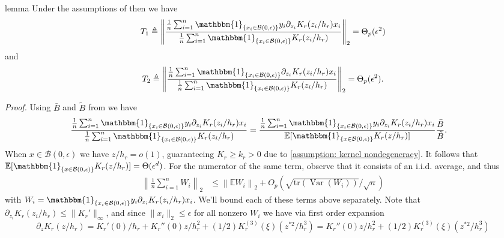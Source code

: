 \documentclass[11pt]{article}
\begin{document}
\begin{restatable}{lemma}{} \label{lemma: psi asymptotics}
    Under the assumptions of  then we have \begin{align*}
    T_1 \triangleq \left\|\frac{\frac{1}{n}\sum_{i = 1}^n\mathbbm{1}_{\{x_i \in \mathcal{B}(0, \epsilon)\}}y_i\partial_{z_i}K_r(z_i/h_r)x_i}{\frac{1}{n}\sum_{i = 1}^n\mathbbm{1}_{\{x_i \in \mathcal{B}(0, \epsilon)\}}K_r(z_i/h_r)}\right\|_2 = \Theta_p(\epsilon^2)
    \end{align*}
    and 
    \begin{align*}
    T_2 \triangleq\left\|\frac{\frac{1}{n}\sum_{i = 1}^n\mathbbm{1}_{\{x_i \in \mathcal{B}(0, \epsilon)\}}\partial_{z_i}K_r(z_i/h_r)x_i}{\frac{1}{n}\sum_{i = 1}^n\mathbbm{1}_{\{x_i \in \mathcal{B}(0, \epsilon)\}}K_r(z_i/h_r)}\right\|_2 = \Theta_p(\epsilon^2).
    \end{align*}
\end{restatable}
\noindent \textit{Proof.} Using $\bar{B}$ and $\tilde{B}$ from  we have
\begin{align}
    \frac{\frac{1}{n}\sum_{i = 1}^n\mathbbm{1}_{\{x_i \in \mathcal{B}(0, \epsilon)\}}y_i\partial_{z_i}K_r(z_i/h_r)x_i}{\frac{1}{n}\sum_{i = 1}^n\mathbbm{1}_{\{x_i \in \mathcal{B}(0, \epsilon)\}}K_r(z_i/h_r)} &= \frac{\frac{1}{n}\sum_{i = 1}^n\mathbbm{1}_{\{x_i \in \mathcal{B}(0, \epsilon)\}}y_i\partial_{z_i}K_r(z_i/h_r)x_i}{\mathbb{E}[\mathbbm{1}_{\{x \in \mathcal{B}(0, \epsilon)\}}K_r(z/h_r)]}\frac{\bar{B}}{\tilde{B}}. 
\end{align}
When $x \in \mathcal{B}(0, \epsilon)$ we have $z/h_r = o(1)$, guaranteeing $K_r \geq k_r > 0$ due to \cref{assumption: kernel nondegeneracy}. It follows that $\mathbb{E}[\mathbbm{1}_{\{x \in \mathcal{B}(0, \epsilon)\}}K_r(z/h_r)] = \Theta(\epsilon^d)$. For the numerator of the same term, observe that it consists of an i.i.d. average, and thus
\begin{align}
    \left\|\frac{1}{n}\sum_{i = 1}^nW_i\right\|_2 &\leq \left\|\mathbb{E}W_i\right\|_2 + O_p\left(\sqrt{\text{tr}(\operatorname{Var}(W_i))}/\sqrt{n}\right) \label{eq: W_i bound}
\end{align}
with $W_i = \mathbbm{1}_{\{x_i \in \mathcal{B}(0, \epsilon)\}}y_i\partial_{z_i}K_r(z_i/h_r)x_i$. We'll bound each of these terms above separately. Note that $\partial_{z_i}K_r(z_i/h_r) \leq \|K_r'\|_{\infty}$, and since $\|x_i\|_2 \leq \epsilon$ for all nonzero $W_i$ we have via first order expansion
\[\partial_{z}K_r(z/h_r) = K_r'(0)/h_r + K_r''(0)z/h_r^2 + (1/2)K^{(3)}_r(\xi)(z^{*2}/h_r^3) = K_r''(0)z/h_r^2 + (1/2)K^{(3)}_r(\xi)(z^{*2}/h_r^3)\]
\end{document}
